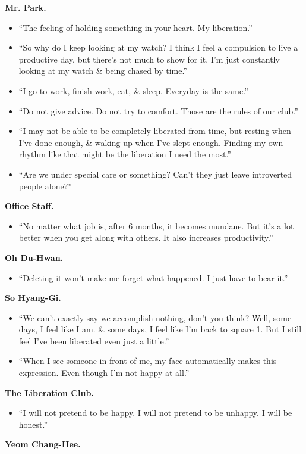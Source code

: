 \documentclass[oneside]{book}
\numberwithin{equation}{section}
\begin{document}
\begin{enumerate}
	\textbf{Mr. Park.}
	\begin{itemize}
		\item ``The feeling of holding something in your heart. My liberation.''
		\item ``So why do I keep looking at my watch? I think I feel a compulsion to live a productive day, but there's not much to show for it. I'm just constantly looking at my watch \& being chased by time.''
		\item ``I go to work, finish work, eat, \& sleep. Everyday is the same.''
		\item ``Do not give advice. Do not try to comfort. Those are the rules of our club.''
		\item ``I may not be able to be completely liberated from time, but resting when I've done enough, \& waking up when I've slept enough. Finding my own rhythm like that might be the liberation I need the most.''
		\item ``Are we under special care or something? Can't they just leave introverted people alone?''
	\end{itemize}
	\textbf{Office Staff.}
	\begin{itemize}
		\item ``No matter what job is, after 6 months, it becomes mundane. But it's a lot better when you get along with others. It also increases productivity.''
	\end{itemize}
	\textbf{Oh Du-Hwan.}
	\begin{itemize}
		\item ``Deleting it won't make me forget what happened. I just have to bear it.''
	\end{itemize}
	\textbf{So Hyang-Gi.}
	\begin{itemize}
		\item ``We can't exactly say we accomplish nothing, don't you think? Well, some days, I feel like I am. \& some days, I feel like I'm back to square 1. But I still feel I've been liberated even just a little.''
		\item ``When I see someone in front of me, my face automatically makes this expression. Even though I'm not happy at all.''
	\end{itemize}
	\textbf{The Liberation Club.}
	\begin{itemize}
		\item ``I will not pretend to be happy. I will not pretend to be unhappy. I will be honest.''
	\end{itemize}
	\textbf{Yeom Chang-Hee.}
	\begin{itemize}

\end{itemize}
\end{enumerate}
\end{document}
